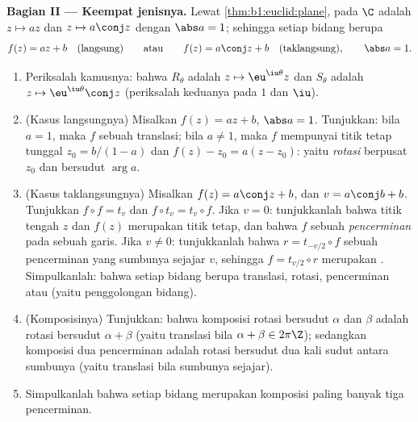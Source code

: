 \begin{problem}
\medskip
\noindent\textbf{Bagian II --- Keempat jenisnya.} Lewat
\cref{thm:b1:euclid:plane},   pada $\C$ adalah $z
\mapsto az$ dan $z \mapsto a\conj z$ dengan $\abs a = 1$; sehingga setiap
 bidang berupa
\[
f(z) = a z + b \quad (\text{langsung}) \qquad\text{atau}\qquad
f(z) = a\conj z + b \quad (\text{taklangsung}), \qquad \abs a = 1 .
\]
\begin{enumerate}[resume]
  \item Periksalah kamusnya: bahwa $R_\theta$ adalah $z \mapsto
        \eu^{\iu\theta}z$ dan $S_\theta$ adalah $z \mapsto
        \eu^{\iu\theta}\conj z$ (periksalah keduanya pada $1$ dan $\iu$).
  \item (Kasus langsungnya) Misalkan $f(z) = az + b$, $\abs a = 1$. Tunjukkan:
        bila $a = 1$, maka $f$ sebuah translasi; bila $a \neq 1$, maka $f$ mempunyai
        titik tetap tunggal $z_0 = b/(1 - a)$ dan $f(z) - z_0
        = a(z - z_0)$: yaitu \emph{rotasi} berpusat $z_0$ dan
        bersudut $\arg a$.
  \item (Kasus taklangsungnya) Misalkan $f(z) = a\conj z + b$, dan $v =
        a\conj b + b$. Tunjukkan $f \circ f = t_v$ dan $f \circ t_v =
        t_v \circ f$. Jika $v = 0$: tunjukkanlah bahwa titik tengah $z$
        dan $f(z)$ merupakan titik tetap, dan bahwa $f$ sebuah
        \emph{pencerminan} pada sebuah garis. Jika $v \neq 0$: tunjukkanlah bahwa $r
        = t_{-v/2}\circ f$ sebuah pencerminan yang sumbunya
        sejajar $v$, sehingga $f = t_{v/2} \circ r$ merupakan
        \emph{}. Simpulkanlah: bahwa setiap  bidang
        berupa translasi, rotasi, pencerminan atau  (yaitu penggolongan  bidang).
  \item (Komposisinya) Tunjukkan: bahwa komposisi rotasi
        bersudut $\alpha$ dan $\beta$ adalah rotasi bersudut
        $\alpha + \beta$ (yaitu translasi bila $\alpha + \beta \in
        2\pi\Z$); sedangkan komposisi dua pencerminan adalah
        rotasi bersudut dua kali sudut antara sumbunya (yaitu
        translasi bila sumbunya sejajar).
  \item Simpulkanlah bahwa setiap  bidang merupakan komposisi paling
        banyak tiga pencerminan.
\end{enumerate}


\end{problem}
